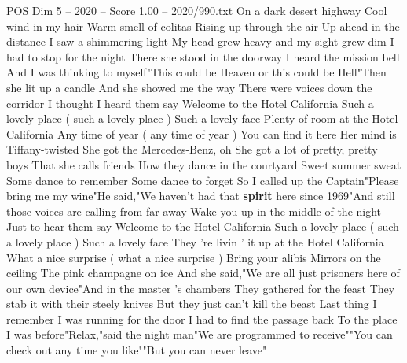 \begin{textsample}{POS Dim 5 – 2020 – Score 1.00 – 2020/990.txt}  \label{ex:f5_pos_024}
On a dark desert highway Cool wind in my hair Warm smell of colitas Rising up through the air Up ahead in the distance I saw a shimmering light My head grew heavy and my sight grew dim I had to stop for the night There she stood in the doorway I heard the mission bell And I was thinking to myself"This could be Heaven or this could be Hell"Then she lit up a candle And she showed me the way There were voices down the corridor I thought I heard them say Welcome to the Hotel California Such a lovely place ( such a lovely place ) Such a lovely face Plenty of room at the Hotel California Any time of year ( any time of year ) You can find it here Her mind is Tiffany-twisted She got the Mercedes-Benz, oh She got a lot of pretty, pretty boys That she calls friends How they dance in the courtyard Sweet summer sweat Some dance to remember Some dance to forget So I called up the Captain"Please bring me my wine"He said,"We haven't had that \textbf{spirit} here since 1969"And still those voices are calling from far away Wake you up in the middle of the night Just to hear them say Welcome to the Hotel California Such a lovely place ( such a lovely place ) Such a lovely face They 're livin ' it up at the Hotel California What a nice surprise ( what a nice surprise ) Bring your alibis Mirrors on the ceiling The pink champagne on ice And she said,"We are all just prisoners here of our own device"And in the master 's chambers They gathered for the feast They stab it with their steely knives But they just can't kill the beast Last thing I remember I was running for the door I had to find the passage back To the place I was before"Relax,"said the night man"We are programmed to receive""You can check out any time you like""But you can never leave"

\end{textsample}
